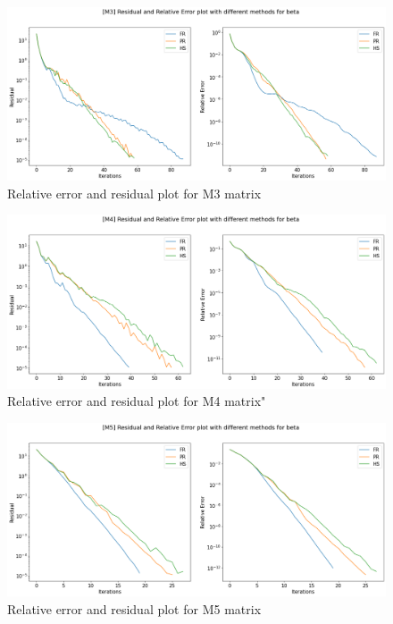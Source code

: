 \documentclass{article}
\numberwithin{equation}{section}
\begin{document}
\begin{figure}[H]
    \centering
    \includegraphics[scale=0.25]{cgd/M3.png}
    \caption{Relative error and residual plot for M3 matrix}
    \label{fig:err_m3}
\end{figure}

\begin{figure}[H]
    \centering
    \includegraphics[scale=0.24]{cgd/M4.png}
    \caption{Relative error and residual plot for M4 matrix"}
    \label{fig:err_m4}
\end{figure}

\begin{figure}[H]
    \centering
    \includegraphics[scale=0.25]{cgd/M5.png}
    \caption{Relative error and residual plot for M5 matrix}
    \label{fig:err_m5}
\end{figure}
\end{document}
